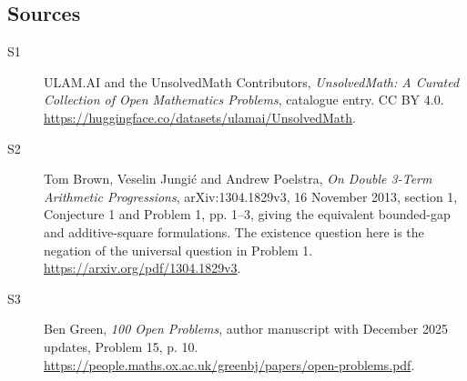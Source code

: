 \documentclass[11pt]{article}
\begin{document}
\subsection{Sources}
\begin{description}
\item[\hypertarget{source:statement:1}{S1}] ULAM.AI and the UnsolvedMath Contributors, \emph{UnsolvedMath: A Curated Collection of Open Mathematics Problems}, catalogue entry. CC BY 4.0. \url{https://huggingface.co/datasets/ulamai/UnsolvedMath}.
\item[\hypertarget{source:statement:2}{S2}] Tom Brown, Veselin Jungić and Andrew Poelstra, \emph{On Double 3-Term Arithmetic Progressions}, arXiv:1304.1829v3, 16 November 2013, section 1, Conjecture 1 and Problem 1, pp. 1--3, giving the equivalent bounded-gap and additive-square formulations. The existence question here is the negation of the universal question in Problem 1. \url{https://arxiv.org/pdf/1304.1829v3}.
\item[\hypertarget{source:statement:3}{S3}] Ben Green, \emph{100 Open Problems}, author manuscript with December 2025 updates, Problem 15, p. 10. \url{https://people.maths.ox.ac.uk/greenbj/papers/open-problems.pdf}.
\end{description}
\label{end:statement}
\end{document}
